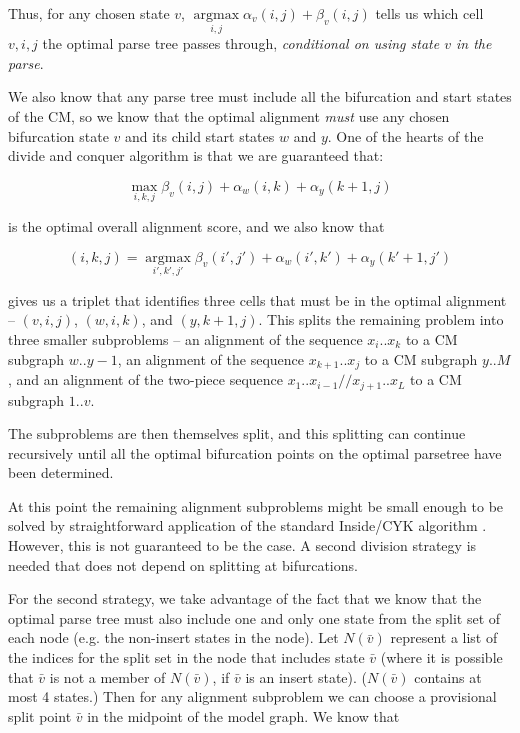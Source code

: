 \documentclass[11pt]{article}
\def\argmax{\mathop{\mathrm{argmax}}\limits}
\begin{document}
Thus, for any chosen state $v$, $\argmax_{i,j} \alpha_{v}(i,j) +
\beta_{v}(i,j)$ tells us which cell $v,i,j$ the optimal parse tree
passes through, \emph{conditional on using state $v$ in the parse}.

We also know that any parse tree must include all the bifurcation and
start states of the CM, so we know that the optimal alignment
\emph{must} use any chosen bifurcation state $v$ and its child start
states $w$ and $y$. One of the hearts of the divide and conquer
algorithm is that we are guaranteed that:

\[
   \max_{i,k,j} \beta_{v}(i,j) + \alpha_{w}(i,k) + \alpha_{y}(k+1,j)
\]

is the optimal overall alignment score, and we also know that

\[
      (i,k,j) = \argmax_{i',k',j'}  \beta_{v}(i',j') +
      \alpha_{w}(i',k') + \alpha_{y}(k'+1,j') 
\]

gives us a triplet that identifies three cells that must be in the
optimal alignment -- $(v,i,j)$, $(w,i,k)$, and $(y,k+1,j)$. This
splits the remaining problem into three smaller subproblems -- an
alignment of the sequence $x_{i}..x_{k}$ to a CM subgraph $w..y-1$, an
alignment of the sequence $x_{k+1}..x_{j}$ to a CM subgraph $y..M$,
and an alignment of the two-piece sequence
$x_1..x_{i-1}//x_{j+1}..x_L$ to a CM subgraph $1..v$.

The subproblems are then themselves split, and this splitting can
continue recursively until all the optimal bifurcation points on the
optimal parsetree have been determined.

At this point the remaining alignment subproblems might be small
enough to be solved by straightforward application of the standard
Inside/CYK algorithm . However, this is not guaranteed to be the
case. A second division strategy is needed that does not depend on
splitting at bifurcations.

For the second strategy, we take advantage of the fact that we know
that the optimal parse tree must also include one and only one state
from the split set of each node (e.g. the non-insert states in the
node). Let $N(\bar{v})$ represent a list of the indices for the split
set in the node that includes state $\bar{v}$ (where it is possible
that $\bar{v}$ is not a member of $N(\bar{v})$, if $\bar{v}$ is an
insert state). ($N(\bar{v})$ contains at most 4 states.) Then for any
alignment subproblem we can choose a provisional split point $\bar{v}$
in the midpoint of the model graph. We know that
\end{document}

